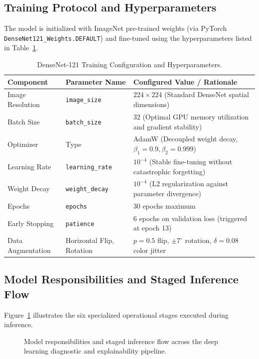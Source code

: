 \documentclass[12pt,a4paper]{report}
\begin{document}
\subsection{Training Protocol and Hyperparameters}
The model is initialized with ImageNet pre-trained weights (via PyTorch \texttt{DenseNet121\_\allowbreak Weights.\allowbreak DEFAULT}) and fine-tuned using the hyperparameters listed in Table~\ref{tab:ml_hyperparameters}.

\begin{table}[H]
\centering
\caption{DenseNet-121 Training Configuration and Hyperparameters.}
\label{tab:ml_hyperparameters}
\small
\begin{tabularx}{\textwidth}{l p{4.2cm} X}
\toprule
\textbf{Component} & \textbf{Parameter Name} & \textbf{Configured Value / Rationale} \\
\midrule
Image Resolution & \texttt{image\_size} & $224 \times 224$ (Standard DenseNet spatial dimensions) \\
Batch Size & \texttt{batch\_size} & 32 (Optimal GPU memory utilization and gradient stability) \\
Optimizer & Type & AdamW (Decoupled weight decay, $\beta_1=0.9, \beta_2=0.999$) \\
Learning Rate & \texttt{learning\_rate} & $10^{-4}$ (Stable fine-tuning without catastrophic forgetting) \\
Weight Decay & \texttt{weight\_decay} & $10^{-4}$ (L2 regularization against parameter divergence) \\
Epochs & \texttt{epochs} & 30 epochs maximum \\
Early Stopping & \texttt{patience} & 6 epochs on validation loss (triggered at epoch 13) \\
Data Augmentation & Horizontal Flip, Rotation & $p=0.5$ flip, $\pm 7^\circ$ rotation, $\delta=0.08$ color jitter \\
\bottomrule
\end{tabularx}
\end{table}

\subsection{Model Responsibilities and Staged Inference Flow}
Figure~\ref{fig:ml_inference_flow} illustrates the six specialized operational stages executed during inference.

\begin{figure}[H]
    \centering
    \caption{Model responsibilities and staged inference flow across the deep learning diagnostic and explainability pipeline.}
    \label{fig:ml_inference_flow}
\end{figure}
\end{document}
